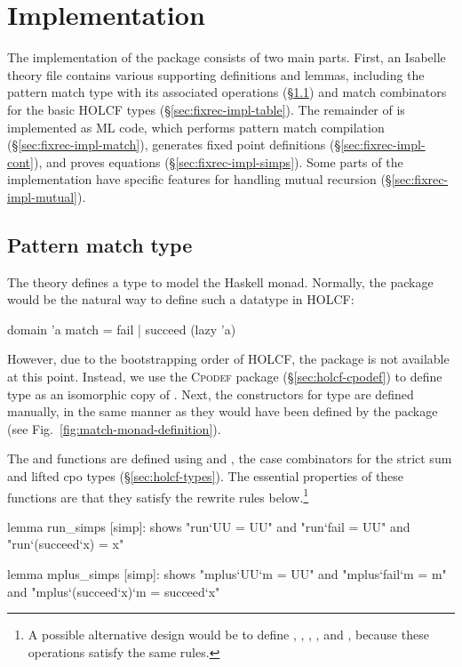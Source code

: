 \section{Implementation}
\label{sec:fixrec-impl}

The implementation of the {\fixrec} package consists of two main parts. First, an Isabelle theory file contains various supporting definitions and lemmas, including the pattern match type with its associated operations (\S\ref{sec:fixrec-impl-type}) and match combinators for the basic HOLCF types (\S\ref{sec:fixrec-impl-table}). The remainder of {\fixrec} is implemented as ML code, which performs pattern match compilation (\S\ref{sec:fixrec-impl-match}), generates fixed point definitions (\S\ref{sec:fixrec-impl-cont}), and proves equations (\S\ref{sec:fixrec-impl-simps}). Some parts of the implementation have specific features for handling mutual recursion (\S\ref{sec:fixrec-impl-mutual}).

\subsection{Pattern match type}
\label{sec:fixrec-impl-type}

The {\fixrec} theory defines a type  to model the Haskell  monad. Normally, the {\domain} package would be the natural way to define such a datatype in HOLCF:
%
\begin{isacode}
domain 'a match = fail | succeed (lazy 'a)
\end{isacode}
%
However, due to the bootstrapping order of HOLCF, the {\domain} package is not available at this point. Instead, we use the \textsc{Cpodef} package (\S\ref{sec:holcf-cpodef}) to define type  as an isomorphic copy of . Next, the constructors for type  are defined manually, in the same manner as they would have been defined by the {\domain} package (see Fig.~\ref{fig:match-monad-definition}).

The  and  functions are defined using  and , the case combinators for the strict sum and lifted cpo types (\S\ref{sec:holcf-types}). The essential properties of these functions are that they satisfy the rewrite rules below.\footnote{A possible alternative design would be to define , , , , and , because these operations satisfy the same rules.}
%
\begin{isacode}
lemma run_simps [simp]:
  shows "run`UU = UU" and "run`fail = UU" and "run`(succeed`x) = x"
\end{isacode}
\unmedskip
{}
\begin{isacode}
lemma mplus_simps [simp]:
  shows "mplus`UU`m = UU" and "mplus`fail`m = m"
    and "mplus`(succeed`x)`m = succeed`x"
\end{isacode}
\unmedskip

